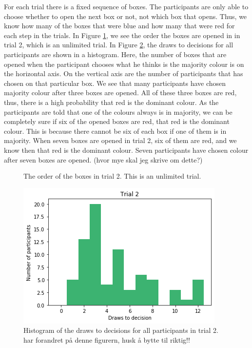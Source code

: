 For each trial there is a fixed sequence of boxes. The participants are only able to choose whether to open the next box or not, not which box that opens. Thus, we know how many of the boxes that were blue and how many that were red for each step in the trials. In Figure \ref{fig:trial2_order}, we see the order the boxes are opened in in trial 2, which is an unlimited trial. In Figure \ref{fig:histogram_trial2}, the draws to decisions for all participants are shown in a histogram. Here, the number of boxes that are opened when the participant chooses what he thinks is the majority colour is on the horizontal axis. On the vertical axis are the number of participants that has chosen on that particular box. We see that many participants have chosen majority colour after three boxes are opened. All of these three boxes are red, thus, there is a high probability that red is the dominant colour. 
As the participants are told that one of the colours always is in majority, we can be completely sure if six of the opened boxes are red, that red is the dominant colour. This is because there cannot be six of each box if one of them is in majority. When seven boxes are opened in trial 2, six of them are red, and we know then that red is the dominant colour. Seven participants have chosen colour after seven boxes are opened. (hvor mye skal jeg skrive om dette?)
\begin{figure}
    \centering
    \scalebox{0.8}{}
    \caption[Order of boxes in trial 2]{The order of the boxes in trial 2. This is an unlimited trial.}
    \label{fig:trial2_order}
\end{figure}


\begin{figure}
    \centering
    \includegraphics[scale=0.6]{pictures/dtd2_histogram.png}
    \caption[Draws to decisions in trial 2]{Histogram of the draws to decisions for all participants in trial 2. 
    har forandret på denne figurern, husk å bytte til riktig!!}
    \label{fig:histogram_trial2}
\end{figure}


